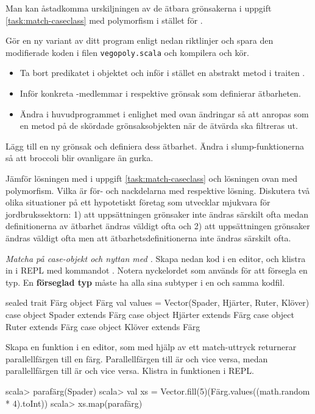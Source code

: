 \Task Man kan åstadkomma urskiljningen av de ätbara grönsakerna i uppgift \ref{task:match-caseclass} med polymorfism i stället för . 

\Subtask Gör en ny variant av ditt program enligt nedan riktlinjer och spara den modifierade koden i filen \texttt{vegopoly.scala} och kompilera och kör.
\begin{itemize}[noitemsep]
\item Ta bort predikatet  i objektet  och inför i stället en abstrakt metod  i traiten .
\item Inför konkreta -medlemmar i respektive grönsak som definierar ätbarheten.
\item Ändra i huvudprogrammet i enlighet med ovan ändringar så att  anropas som en metod på de skördade grönsaksobjekten när de ätvärda ska filtreras ut.
\end{itemize} 

\Subtask Lägg till en ny grönsak  och definiera dess ätbarhet. Ändra i slump-funktionerna så att broccoli blir ovanligare än gurka.

\Subtask\Pen Jämför lösningen med  i uppgift \ref{task:match-caseclass} och lösningen ovan med polymorfism. Vilka är för- och nackdelarna med respektive lösning. Diskutera två olika situationer på ett hypotetiskt företag som utvecklar mjukvara för jordbrukssektorn: 1) att uppsättningen grönsaker inte ändras särskilt ofta medan definitionerna av ätbarhet ändras väldigt ofta och 2) att uppsättningen grönsaker ändras väldigt ofta men att ätbarhetsdefinitionerna inte ändras särskilt ofta.



\Task \emph{Matcha på case-objekt och nyttan med .} Skapa nedan kod i en editor, och klistra in i REPL med kommandot . Notera nyckelordet  som används för att försegla en typ. En \textbf{förseglad typ} måste ha alla sina subtyper i en och samma kodfil.
\begin{Code}
sealed trait Färg
object Färg { 
  val values = Vector(Spader, Hjärter, Ruter, Klöver) 
}
case object Spader  extends Färg
case object Hjärter extends Färg
case object Ruter   extends Färg
case object Klöver  extends Färg
\end{Code}

\Subtask Skapa en funktion  i en editor, som med hjälp av ett match-uttryck returnerar parallellfärgen till en färg. Parallellfärgen till  är  och vice versa, medan parallellfärgen till  är  och vice versa. Klistra in funktionen i REPL.
\begin{REPL}
scala> parafärg(Spader)
scala> val xs = Vector.fill(5)(Färg.values((math.random * 4).toInt))  
scala> xs.map(parafärg)
\end{REPL}

